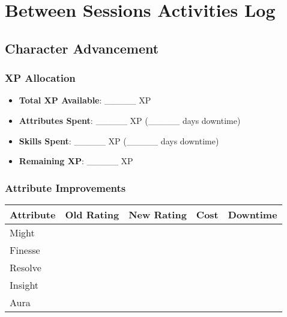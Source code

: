 \section{Between Sessions Activities Log}

\subsection{Character Advancement}

\subsubsection{XP Allocation}
\begin{itemize}
    \item \textbf{Total XP Available}: \_\_\_\_\_ XP
    \item \textbf{Attributes Spent}: \_\_\_\_\_ XP (\_\_\_\_\_ days downtime)
    \item \textbf{Skills Spent}: \_\_\_\_\_ XP (\_\_\_\_\_ days downtime)
    \item \textbf{Remaining XP}: \_\_\_\_\_ XP
\end{itemize}

\subsubsection{Attribute Improvements}
\begin{tabular}{|p{3cm}|c|c|c|c|}
\hline
\textbf{Attribute} & \textbf{Old Rating} & \textbf{New Rating} & \textbf{Cost} & \textbf{Downtime} \\
\hline
Might & & & & \\
Finesse & & & & \\
Resolve & & & & \\
Insight & & & & \\
Aura & & & & \\
\hline
\end{tabular}

